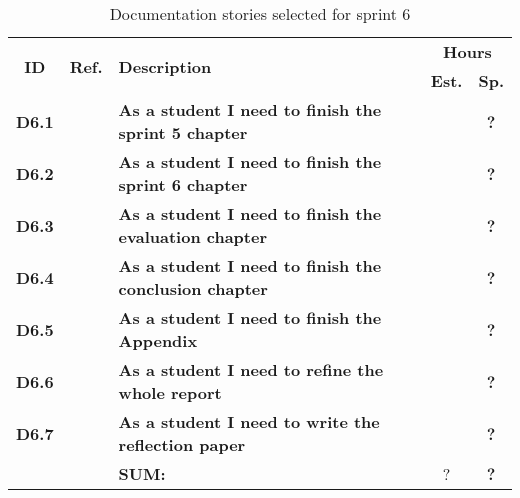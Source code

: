 \begin{table*}[!ht]%
 \def\arraystretch{1.25}
 
 \caption{Documentation stories selected for sprint 6}
   \label{tab:sprint6Documentationstories}

\begin{tabularx}{\textwidth}{ccXcc} 

\toprule[0.5mm]
\multirow{2}{*}{\textbf{ID}} &
\multirow{2}{*}{\textbf{Ref.}} & \multirow{2}{*}{\textbf{Description}} & \multicolumn{2}{c}{\textbf{Hours}} \\
 					& & & \textbf{Est.} & \textbf{Sp.} \\
\midrule

\textbf{D6.1} 	& & {\bf As a student I need to finish the sprint 5 chapter} 		&   & \textbf{?} \\
	
\textbf{D6.2} 	& & {\bf As a student I need to finish the sprint 6 chapter} 		& 	& \textbf{?} \\

\textbf{D6.3} 	& & {\bf As a student I need to finish the evaluation chapter} 		& 	& \textbf{?} \\

\textbf{D6.4} 	&& {\bf As a student I need to finish the conclusion chapter} 		& 	& \textbf{?} \\

\textbf{D6.5} 	&& {\bf As a student I need to finish the Appendix} 				& 	& \textbf{?} \\

\textbf{D6.6} 	&& {\bf As a student I need to refine the whole report} 			& 	& \textbf{?} \\
\textbf{D6.7} 	&& {\bf As a student I need to write the reflection paper} 			& 	& \textbf{?} \\
\midrule
		
				&& \textbf{SUM:}		&	?	& \textbf{?}
 \\																			
\bottomrule[0.5mm]
\end{tabularx}
\end{table*}
